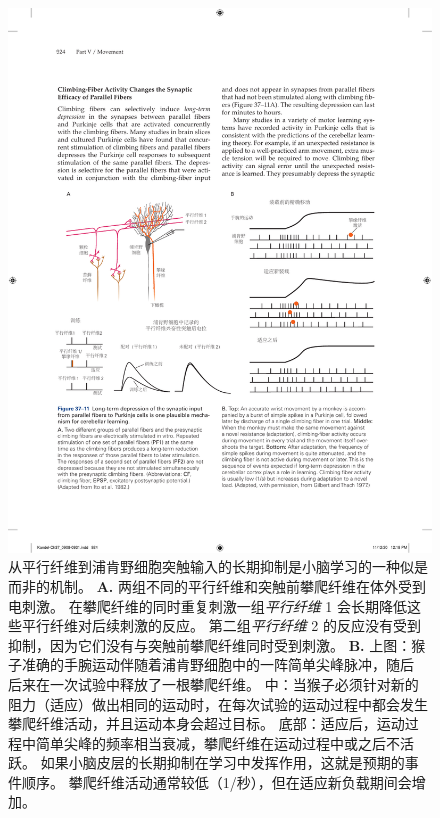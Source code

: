 \begin{figure}[htbp]
	\centering
	\includegraphics[width=1.0\linewidth]{chap37/fig_37_11}
	\caption{从平行纤维到浦肯野细胞突触输入的长期抑制是小脑学习的一种似是而非的机制。
		\textbf{A.} 两组不同的平行纤维和突触前攀爬纤维在体外受到电刺激。
		在攀爬纤维的同时重复刺激一组\textit{平行纤维} 1 会长期降低这些平行纤维对后续刺激的反应。
		第二组\textit{平行纤维} 2 的反应没有受到抑制，因为它们没有与突触前攀爬纤维同时受到刺激\cite{ito1982climbing}。
		\textbf{B.} 上图：猴子准确的手腕运动伴随着浦肯野细胞中的一阵简单尖峰脉冲，随后 后来在一次试验中释放了一根攀爬纤维。
		中：当猴子必须针对新的阻力（适应）做出相同的运动时，在每次试验的运动过程中都会发生攀爬纤维活动，并且运动本身会超过目标。
		底部：适应后，运动过程中简单尖峰的频率相当衰减，攀爬纤维在运动过程中或之后不活跃。
		如果小脑皮层的长期抑制在学习中发挥作用，这就是预期的事件顺序。
		攀爬纤维活动通常较低（1/秒），但在适应新负载期间会增加\cite{gilbert1977purkinje}。}
	\label{fig:37_11}
\end{figure}


